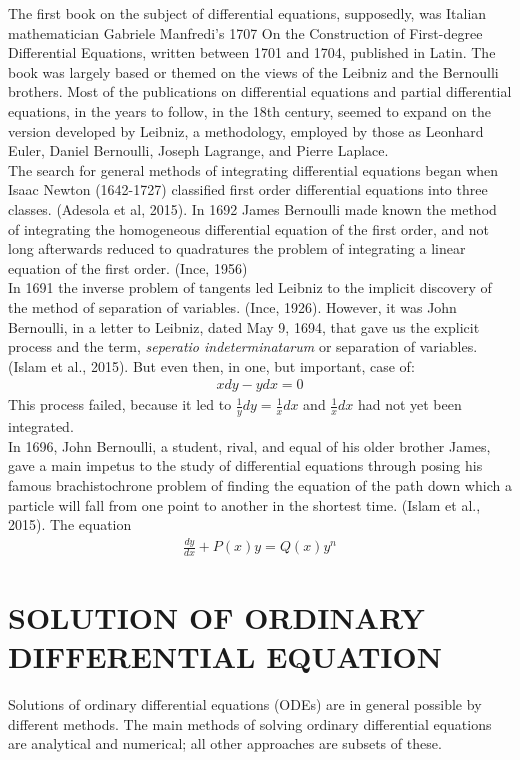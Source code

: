 \documentclass[11pt]{report}
\newcommand{\dsp}{\displaystyle}
\newcommand{\NI}{\noindent}
\begin{document}
	\NI The first book on the subject of differential equations, supposedly, was Italian mathematician Gabriele Manfredi’s 1707 On the Construction of First-degree Differential Equations, written between 1701 and 1704, published in Latin.  The book was largely based or themed on the views of the Leibniz and the Bernoulli brothers. Most of the publications on differential equations and partial differential equations, in the years to follow, in the 18th century, seemed to expand on the version developed by Leibniz, a methodology, employed by those as Leonhard Euler, Daniel Bernoulli, Joseph Lagrange, and Pierre Laplace.\\
	
	\NI The search for general methods of integrating differential equations began when Isaac Newton (1642-1727) classified first order differential equations into three classes. (Adesola et al, 2015). In 1692 James Bernoulli made known the method of integrating the homogeneous differential 
	equation of the first order, and not long afterwards reduced to quadratures the problem of integrating a linear equation of the first order. (Ince, 1956)\\

	\NI In 1691 the inverse problem of tangents led Leibniz to the implicit discovery of the method of separation of variables. (Ince, 1926). However, it was John Bernoulli, in a letter to Leibniz, dated May 9, 1694, that gave us the explicit process and the term, \emph{seperatio indeterminatarum} or separation of variables. (Islam et al., 2015). But even then, in one, but important, case of: 
	\begin{eqnarray*}
		x dy - y dx = 0
	\end{eqnarray*}
	This process failed, because it led to $\dsp \frac{1}{y}dy = \frac{1}{x}dx$ and $\dsp \frac{1}{x}dx$ had not yet been integrated.\\
	
	\NI In 1696, John Bernoulli, a student, rival, and equal of his older brother James, gave a main impetus to the study of differential equations through posing his famous brachistochrone problem of finding the equation of the path down which a particle will fall from one point to another in the shortest time. (Islam et al., 2015). The equation
	\begin{eqnarray*}
		\frac{dy}{dx} + P(x)y = Q(x)y^n
	\end{eqnarray*} 
	
	\section{SOLUTION OF ORDINARY DIFFERENTIAL EQUATION}
	Solutions of ordinary differential equations (ODEs) are in general possible by different methods. The main methods of solving ordinary differential equations are analytical and numerical; all other approaches are subsets of these.\\
	
\end{document}
